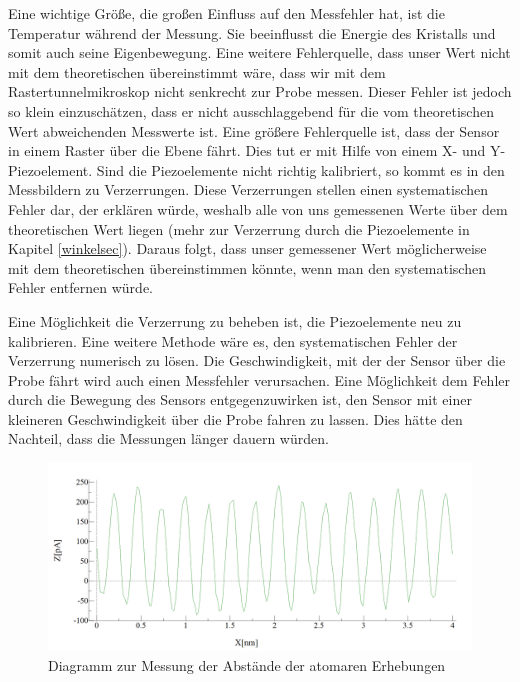 \documentclass[10pt,a4paper]{article}
\begin{document}
Eine wichtige Größe, die großen Einfluss auf den Messfehler hat, ist die Temperatur während der Messung. Sie beeinflusst die Energie des Kristalls und somit auch seine Eigenbewegung. Eine weitere Fehlerquelle, dass unser Wert nicht mit dem theoretischen übereinstimmt wäre, dass wir mit dem Rastertunnelmikroskop nicht senkrecht zur Probe messen. Dieser Fehler ist jedoch so klein einzuschätzen, dass er nicht ausschlaggebend für die vom theoretischen Wert abweichenden Messwerte ist. Eine größere Fehlerquelle ist, dass der Sensor in einem Raster über die Ebene fährt. Dies tut er mit Hilfe von einem X- und Y-Piezoelement. Sind die Piezoelemente nicht richtig kalibriert, so kommt es in den Messbildern zu Verzerrungen. Diese Verzerrungen stellen einen systematischen Fehler dar, der erklären würde, weshalb alle von uns gemessenen Werte über dem theoretischen Wert liegen (mehr zur Verzerrung durch die Piezoelemente in Kapitel \ref{winkelsec}). Daraus folgt, dass unser gemessener Wert möglicherweise mit dem theoretischen übereinstimmen könnte, wenn man den systematischen Fehler entfernen würde.  

Eine Möglichkeit die Verzerrung zu beheben ist, die Piezoelemente neu zu kalibrieren. Eine weitere Methode wäre es, den systematischen Fehler der Verzerrung numerisch zu lösen. Die Geschwindigkeit, mit der der Sensor über die Probe fährt wird auch einen Messfehler verursachen. Eine Möglichkeit dem Fehler durch die Bewegung des Sensors entgegenzuwirken ist, den Sensor mit einer kleineren Geschwindigkeit über die Probe fahren zu lassen. Dies hätte den Nachteil, dass die Messungen länger dauern würden.

\begin{figure}[h]
	\centering
	
	\includegraphics[scale = 0.3]{Aufnahme_Ebene_doppelte_fourier.png}
	
	\caption{Diagramm zur Messung der Abstände der atomaren Erhebungen}
	\label{Messungerh2}
\end{figure}
\end{document}
